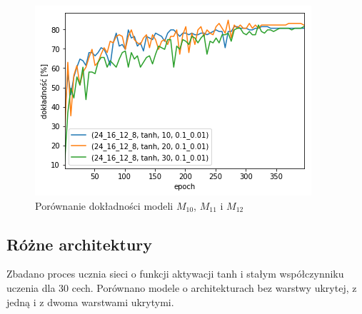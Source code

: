    \begin{figure}[htp]
        \centering
        \includegraphics[scale=0.8]{./img/feat-accuracy-tanh.png}
        \caption{Porównanie dokładności modeli $M_{10}$, $M_{11}$ i $M_{12}$}
    \end{figure}

    \subsection{Różne architektury}\label{subsec:różneArchitektury2}

    Zbadano proces ucznia sieci o funkcji aktywacji tanh i stałym współczynniku uczenia dla 30 cech.
    Porównano modele o architekturach bez warstwy ukrytej, z jedną i z dwoma warstwami ukrytymi.

